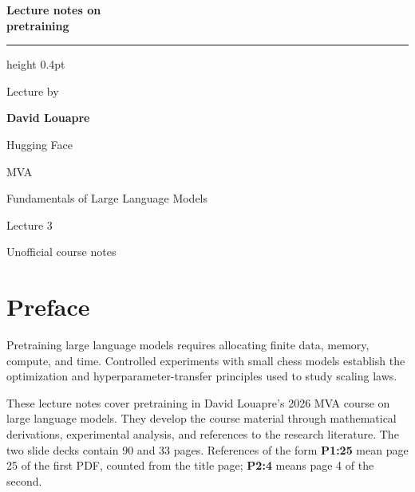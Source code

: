 \documentclass[11pt,a4paper,oneside]{report}
\begin{document}
\begin{titlepage}
\centering
\vspace*{4.2cm}
{\fontsize{30}{38}\selectfont\bfseries
Lecture notes on\\[0.15cm]
pretraining\par}
\vfill
\begin{minipage}{\textwidth}
\hrule height 0.4pt
\vspace{0.65cm}
\noindent\begin{minipage}[t]{.40\linewidth}
\raggedright
{\small Lecture by\par}
\vspace{0.22cm}
{\normalsize\textbf{David Louapre}\par}
\vspace{0.12cm}
{\small Hugging Face\par}
\end{minipage}\hfill
\begin{minipage}[t]{.56\linewidth}
\raggedleft
{\small MVA\par}
\vspace{0.22cm}
{\normalsize Fundamentals of Large Language Models\par}
\vspace{0.12cm}
{\small Lecture 3\enspace\textbullet{}\par}
\end{minipage}\par
\vspace{0.9cm}
\centering
{\footnotesize\color{black!60} Unofficial course notes\par}
\end{minipage}
\vspace*{0.8cm}
\end{titlepage}
\chapter*{Preface}
Pretraining large language models requires allocating finite data, memory, compute, and time. Controlled experiments with small chess models establish the optimization and hyperparameter-transfer principles used to study scaling laws.

These lecture notes cover pretraining in David Louapre's 2026 MVA course on large language models. They develop the course material through mathematical derivations, experimental analysis, and references to the research literature. The two slide decks contain 90 and 33 pages. References of the form \textbf{P1:25} mean page 25 of the first PDF, counted from the title page; \textbf{P2:4} means page 4 of the second.
\end{document}

